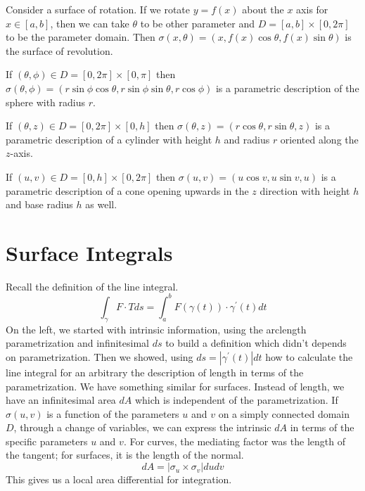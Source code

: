 \documentclass[fleqn,letterpaper]{report}
\begin{document}
\begin{example}
\label{example-surface-revolution}
Consider a surface of rotation. If we rotate $y = f(x)$ about
the $x$ axis for $x \in [a,b]$, then we can take $\theta$ to
be other parameter and $D =[a,b] \times [0, 2\pi]$ to be the
parameter domain. Then $\sigma(x,\theta) = (x, f(x) \cos
\theta, f(x) \sin \theta)$ is the surface of revolution.
\end{example}

\begin{example}
\label{example-sphere-parametrization}
If $(\theta, \phi) \in D = [0, 2\pi] \times [0, \pi]$ then
$\sigma (\theta, \phi) = (r \sin \phi \cos \theta, r \sin \phi
\sin \theta, r \cos \phi)$ is a parametric description of the
sphere with radius $r$.
\end{example}

\begin{example}
If $(\theta, z) \in D = [0, 2\pi] \times [0,h]$ then $\sigma
(\theta, z) = (r \cos \theta, r \sin \theta, z)$ is a
parametric description of a cylinder with height $h$ and
radius $r$ oriented along the $z$-axis. 
\end{example}

\begin{example}
If $(u,v) \in D = [0,h] \times [0, 2\pi]$ then $\sigma (u,v) =
(u \cos v, u \sin v, u)$ is a parametric description of a cone
opening upwards in the $z$ direction with height $h$ and base
radius $h$ as well.
\end{example}

\section{Surface Integrals}
\label{surface-integrals}

Recall the definition of the line integral.
\begin{equation*}
\int_{\gamma} F \cdot T ds = \int_a^b F(\gamma(t)) \cdot
\gamma^\prime(t) dt 
\end{equation*}
On the left, we started with intrinsic information, using the
arclength parametrization and infinitesimal $ds$ to build a
definition which didn't depends on parametrization. Then we
showed, using $ds = |\gamma^\prime(t)| dt$ how to calculate
the line integral for an arbitrary 
the description of length in terms of the parametrization. We
have something similar for surfaces. Instead of length, we
have an infinitesimal area $dA$ which is independent of the
parametrization. If $\sigma(u,v)$ is a function of the
parameters $u$ and $v$ on a simply connected domain $D$,
through a change of variables, we can express the intrinsic
$dA$ in terms of the specific parameters $u$ and $v$. For
curves, the mediating factor was the length of the tangent;
for surfaces, it is the length of the normal.
\begin{equation*}
dA = |\sigma_u \times \sigma_v| du dv
\end{equation*}
This gives us a local area differential for integration.
\end{document}
